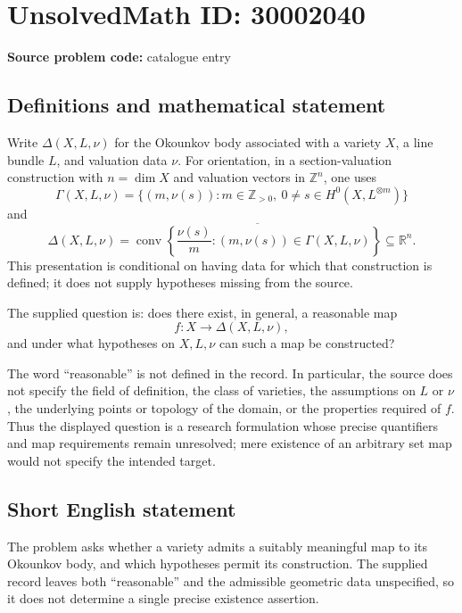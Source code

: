 \documentclass[11pt]{article}
\newcommand{\Z}{\mathbb{Z}}
\newcommand{\R}{\mathbb{R}}
\begin{document}
\section*{UnsolvedMath ID: 30002040}
\textbf{Source problem code:} catalogue entry
\subsection{Definitions and mathematical statement}
Write \(\Delta(X,L,\nu)\) for the Okounkov body associated with a variety \(X\), a line bundle \(L\), and valuation data \(\nu\). For orientation, in a section-valuation construction with \(n=\dim X\) and valuation vectors in \(\Z^n\), one uses
\[
\Gamma(X,L,\nu)=\{(m,\nu(s)):m\in\Z_{>0},\ 0\ne s\in H^0(X,L^{\otimes m})\}
\]
and
\[
\Delta(X,L,\nu)=\overline{\operatorname{conv}\!\left\{\frac{\nu(s)}{m}:(m,\nu(s))\in\Gamma(X,L,\nu)\right\}}\subseteq\R^n.
\]
This presentation is conditional on having data for which that construction is defined; it does not supply hypotheses missing from the source.

The supplied question is: does there exist, in general, a reasonable map
\[
f:X\longrightarrow\Delta(X,L,\nu),
\]
and under what hypotheses on \(X,L,\nu\) can such a map be constructed?

The word ``reasonable'' is not defined in the record. In particular, the source does not specify the field of definition, the class of varieties, the assumptions on \(L\) or \(\nu\), the underlying points or topology of the domain, or the properties required of \(f\). Thus the displayed question is a research formulation whose precise quantifiers and map requirements remain unresolved; mere existence of an arbitrary set map would not specify the intended target.
\subsection{Short English statement}
The problem asks whether a variety admits a suitably meaningful map to its Okounkov body, and which hypotheses permit its construction. The supplied record leaves both ``reasonable'' and the admissible geometric data unspecified, so it does not determine a single precise existence assertion.
\end{document}
